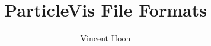 \documentclass[12pt]{article}
\begin{document}
\title{ParticleVis File Formats}
\author{Vincent Hoon}
\date{}
\maketitle

\tableofcontents


\end{document}
